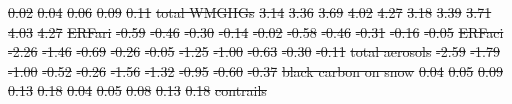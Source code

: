 \documentclass[gmd, manuscript]{copernicus}
\providecommand{\DIFdel}[1]{{\protect\color{red}\sout{#1}}}                      %
\providecommand{\DIFdelFL}[1]{\DIFdel{#1}} %
\begin{document}
\begin{table}[t]
\DIFdelFL{0.02 }%
\DIFdelFL{0.04 }%
\DIFdelFL{0.06 }%
\DIFdelFL{0.09 }%
\DIFdelFL{0.11 }%
\DIFdelFL{total WMGHGs            }%
\DIFdelFL{3.14 }%
\DIFdelFL{3.36 }%
\DIFdelFL{3.69 }%
\DIFdelFL{4.02 }%
\DIFdelFL{4.27 }%
\DIFdelFL{3.18 }%
\DIFdelFL{3.39 }%
\DIFdelFL{3.71 }%
\DIFdelFL{4.03 }%
\DIFdelFL{4.27 }%
\DIFdelFL{ERFari            }%
\DIFdelFL{-0.59 }%
\DIFdelFL{-0.46 }%
\DIFdelFL{-0.30 }%
\DIFdelFL{-0.14 }%
\DIFdelFL{-0.02 }%
\DIFdelFL{-0.58 }%
\DIFdelFL{-0.46 }%
\DIFdelFL{-0.31 }%
\DIFdelFL{-0.16 }%
\DIFdelFL{-0.05 }%
\DIFdelFL{ERFaci            }%
\DIFdelFL{-2.26 }%
\DIFdelFL{-1.46 }%
\DIFdelFL{-0.69 }%
\DIFdelFL{-0.26 }%
\DIFdelFL{-0.05 }%
\DIFdelFL{-1.25 }%
\DIFdelFL{-1.00 }%
\DIFdelFL{-0.63 }%
\DIFdelFL{-0.30 }%
\DIFdelFL{-0.11 }%
\DIFdelFL{total aerosols            }%
\DIFdelFL{-2.59 }%
\DIFdelFL{-1.79 }%
\DIFdelFL{-1.00 }%
\DIFdelFL{-0.52 }%
\DIFdelFL{-0.26 }%
\DIFdelFL{-1.56 }%
\DIFdelFL{-1.32 }%
\DIFdelFL{-0.95 }%
\DIFdelFL{-0.60 }%
\DIFdelFL{-0.37 }%
\DIFdelFL{black carbon on snow     }%
\DIFdelFL{0.04 }%
\DIFdelFL{0.05 }%
\DIFdelFL{0.09 }%
\DIFdelFL{0.13 }%
\DIFdelFL{0.18 }%
\DIFdelFL{0.04 }%
\DIFdelFL{0.05 }%
\DIFdelFL{0.08 }%
\DIFdelFL{0.13 }%
\DIFdelFL{0.18 }%
\DIFdelFL{contrails      }%

\end{table}
\end{document}

